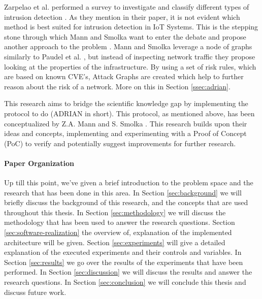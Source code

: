 Zarpelao et al. performed a survey to investigate and classify different types of intrusion detection \cite{zarpelao2017survey}. As they mention in their paper, it is not evident which method is best suited for intrusion detection in IoT Systems. This is the stepping stone through which Mann and Smolka want to enter the debate and propose another approach to the problem \cite{mann2023ADRIAN}. 
Mann and Smolka leverage a node of graphs similarly to Paudel et al. \cite{paudel2019detecting}, but instead of inspecting network traffic they propose looking at the properties of the infrastructure. By using a set of risk rules, which are based on known CVE's, Attack Graphs are created which help to further reason about the risk of a network. More on this in Section \ref{ssec:adrian}.

This research aims to bridge the scientific knowledge gap by implementing the protocol to do \ADRIAN (ADRIAN in short). This protocol, as mentioned above, has been conceptualized by Z.A. Mann and S. Smolka \cite{mann2023ADRIAN}. This research builds upon their ideas and concepts, implementing and experimenting with a Proof of Concept (PoC) to verify and potentially suggest improvements for further research. 


\paragraph{Paper Organization}
Up till this point, we've given a brief introduction to the problem space and the research that has been done in this area. In Section \ref{sec:background} we will briefly discuss the background of this research, and the concepts that are used throughout this thesis. In Section \ref{sec:methodology} we will discuss the methodology that has been used to answer the research questions. Section \ref{sec:software-realization} the overview of, explanation of the implemented architecture will be given. Section \ref{sec:experiments} will give a detailed explanation of the executed experiments and their controls and variables. In Section \ref{sec:results} we go over the results of the experiments that have been performed. In Section \ref{sec:discussion} we will discuss the results and answer the research questions. In Section \ref{sec:conclusion} we will conclude this thesis and discuss future work.
